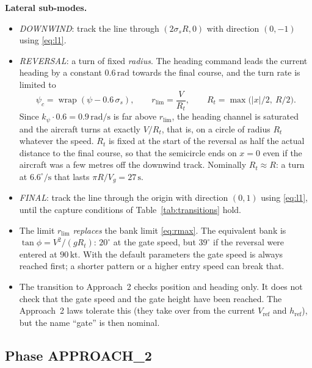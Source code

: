 \documentclass[11pt,a4paper]{article}
\newcommand{\un}[1]{\,\mathrm{#1}}
\newcommand{\wrap}{\operatorname{wrap}}
\begin{document}
\textbf{Lateral sub-modes.}
\begin{itemize}
\item \emph{DOWNWIND}: track the line through $(2\sigma_sR,0)$ with direction
$(0,-1)$ using \eqref{eq:l1}.
\item \emph{REVERSAL}: a turn of fixed \emph{radius}. The heading command leads
the current heading by a constant $0.6\un{rad}$ towards the final course, and
the turn rate is limited to
\begin{equation}
\psi_c = \wrap(\psi - 0.6\,\sigma_s), \qquad
r_{\lim} = \frac{V}{R_t}, \qquad
R_t = \max\!\bigl(|x|/2,\ R/2\bigr).
\end{equation}
Since $k_\psi\cdot0.6=0.9\un{rad/s}$ is far above $r_{\lim}$, the heading
channel is saturated and the aircraft turns at exactly $V/R_t$, that is, on a
circle of radius $R_t$ whatever the speed. $R_t$ is fixed at the start of the
reversal as half the actual distance to the final course, so that the
semicircle ends on $x=0$ even if the aircraft was a few metres off the
downwind track. Nominally $R_t\approx R$: a turn at
$6.6^\circ/\mathrm{s}$ that lasts $\pi R/V_g=27\un{s}$.
\item \emph{FINAL}: track the line through the origin with direction $(0,1)$
using \eqref{eq:l1}, until the capture conditions of
Table~\ref{tab:transitions} hold.
\end{itemize}

\begin{devnote}
\begin{itemize}[leftmargin=1.2em]
\item The limit $r_{\lim}$ \emph{replaces} the bank limit \eqref{eq:rmax}. The
equivalent bank is $\tan\phi=V^2/(gR_t)$: $20^\circ$ at the gate speed, but
$39^\circ$ if the reversal were entered at $90\un{kt}$. With the default
parameters the gate speed is always reached first; a shorter pattern or a
higher entry speed can break that.
\item The transition to Approach~2 checks position and heading only. It does
not check that the gate speed and the gate height have been reached. The
Approach~2 laws tolerate this (they take over from the current
$V_{\text{ref}}$ and $h_{\text{ref}}$), but the name ``gate'' is then nominal.
\end{itemize}
\end{devnote}

\subsection{Phase APPROACH\_2}
\end{document}

